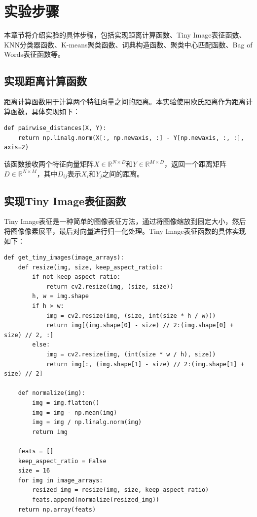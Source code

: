 \section{实验步骤}

本章节将介绍实验的具体步骤，包括实现距离计算函数、Tiny Image表征函数、KNN分类器函数、K-means聚类函数、词典构造函数、聚类中心匹配函数、Bag of Words表征函数等。

\subsection{实现距离计算函数}

距离计算函数用于计算两个特征向量之间的距离。本实验使用欧氏距离作为距离计算函数，具体实现如下：

\begin{lstlisting}[style=Python]
def pairwise_distances(X, Y):
    return np.linalg.norm(X[:, np.newaxis, :] - Y[np.newaxis, :, :], axis=2)
\end{lstlisting}

该函数接收两个特征向量矩阵$X\in\mathbb{R}^{N\times D}$和$Y\in\mathbb{R}^{M\times D}$，返回一个距离矩阵$D\in\mathbb{R}^{N\times M}$，其中$D_{ij}$表示$X_i$和$Y_j$之间的距离。

\subsection{实现Tiny Image表征函数}

Tiny Image表征是一种简单的图像表征方法，通过将图像缩放到固定大小，然后将图像像素展平，最后对向量进行归一化处理。Tiny Image表征函数的具体实现如下：

\begin{lstlisting}[style=Python]
def get_tiny_images(image_arrays):
    def resize(img, size, keep_aspect_ratio):
        if not keep_aspect_ratio:
            return cv2.resize(img, (size, size))
        h, w = img.shape
        if h > w:
            img = cv2.resize(img, (size, int(size * h / w)))
            return img[(img.shape[0] - size) // 2:(img.shape[0] + size) // 2, :]
        else:
            img = cv2.resize(img, (int(size * w / h), size))
            return img[:, (img.shape[1] - size) // 2:(img.shape[1] + size) // 2]

    def normalize(img):
        img = img.flatten()
        img = img - np.mean(img)
        img = img / np.linalg.norm(img)
        return img
    
    feats = []
    keep_aspect_ratio = False
    size = 16
    for img in image_arrays:
        resized_img = resize(img, size, keep_aspect_ratio)
        feats.append(normalize(resized_img))
    return np.array(feats)
\end{lstlisting}

